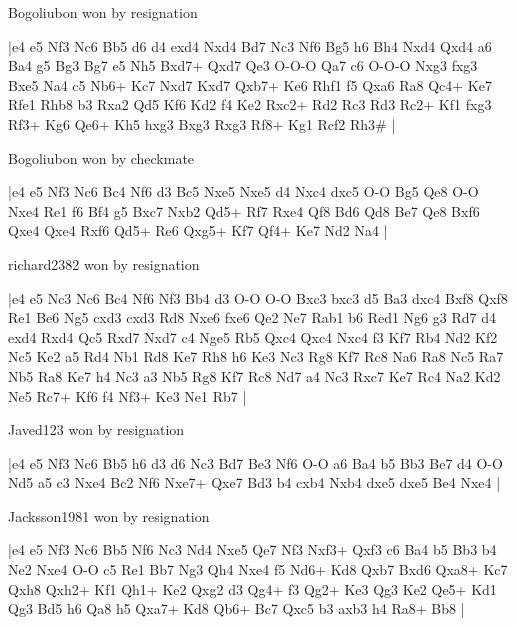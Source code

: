 \showboard

Bogoliubon won by resignation

\makegametitle
|e4 e5 Nf3 Nc6 Bb5 d6 d4 exd4 Nxd4 Bd7 Nc3 Nf6 Bg5 h6 Bh4 Nxd4 Qxd4 a6 Ba4 g5 Bg3 Bg7 e5 Nh5 Bxd7+ Qxd7 Qe3 O-O-O Qa7 c6 O-O-O Nxg3 fxg3 Bxe5 Na4 c5 Nb6+ Kc7 Nxd7 Kxd7 Qxb7+ Ke6 Rhf1 f5 Qxa6 Ra8 Qc4+ Ke7 Rfe1 Rhb8 b3 Rxa2 Qd5 Kf6 Kd2 f4 Ke2 Rxc2+ Rd2 Rc3 Rd3 Rc2+ Kf1 fxg3 Rf3+ Kg6 Qe6+ Kh5 hxg3 Bxg3 Rxg3 Rf8+ Kg1 Rcf2 Rh3\#  |

\showboard

Bogoliubon won by checkmate

\makegametitle
|e4 e5 Nf3 Nc6 Bc4 Nf6 d3 Bc5 Nxe5 Nxe5 d4 Nxc4 dxc5 O-O Bg5 Qe8 O-O Nxe4 Re1 f6 Bf4 g5 Bxc7 Nxb2 Qd5+ Rf7 Rxe4 Qf8 Bd6 Qd8 Be7 Qe8 Bxf6 Qxe4 Qxe4 Rxf6 Qd5+ Re6 Qxg5+ Kf7 Qf4+ Ke7 Nd2 Na4  |

\showboard

richard2382 won by resignation

\makegametitle
|e4 e5 Nc3 Nc6 Bc4 Nf6 Nf3 Bb4 d3 O-O O-O Bxc3 bxc3 d5 Ba3 dxc4 Bxf8 Qxf8 Re1 Be6 Ng5 cxd3 cxd3 Rd8 Nxe6 fxe6 Qe2 Ne7 Rab1 b6 Red1 Ng6 g3 Rd7 d4 exd4 Rxd4 Qc5 Rxd7 Nxd7 c4 Nge5 Rb5 Qxc4 Qxc4 Nxc4 f3 Kf7 Rb4 Nd2 Kf2 Nc5 Ke2 a5 Rd4 Nb1 Rd8 Ke7 Rh8 h6 Ke3 Nc3 Rg8 Kf7 Rc8 Na6 Ra8 Nc5 Ra7 Nb5 Ra8 Ke7 h4 Nc3 a3 Nb5 Rg8 Kf7 Rc8 Nd7 a4 Nc3 Rxc7 Ke7 Rc4 Na2 Kd2 Ne5 Rc7+ Kf6 f4 Nf3+ Ke3 Ne1 Rb7  |

\showboard

Javed123 won by resignation

\makegametitle
|e4 e5 Nf3 Nc6 Bb5 h6 d3 d6 Nc3 Bd7 Be3 Nf6 O-O a6 Ba4 b5 Bb3 Be7 d4 O-O Nd5 a5 c3 Nxe4 Bc2 Nf6 Nxe7+ Qxe7 Bd3 b4 cxb4 Nxb4 dxe5 dxe5 Be4 Nxe4  |

\showboard

Jacksson1981 won by resignation

\makegametitle
|e4 e5 Nf3 Nc6 Bb5 Nf6 Nc3 Nd4 Nxe5 Qe7 Nf3 Nxf3+ Qxf3 c6 Ba4 b5 Bb3 b4 Ne2 Nxe4 O-O c5 Re1 Bb7 Ng3 Qh4 Nxe4 f5 Nd6+ Kd8 Qxb7 Bxd6 Qxa8+ Kc7 Qxh8 Qxh2+ Kf1 Qh1+ Ke2 Qxg2 d3 Qg4+ f3 Qg2+ Ke3 Qg3 Ke2 Qe5+ Kd1 Qg3 Bd5 h6 Qa8 h5 Qxa7+ Kd8 Qb6+ Bc7 Qxc5 b3 axb3 h4 Ra8+ Bb8  |


